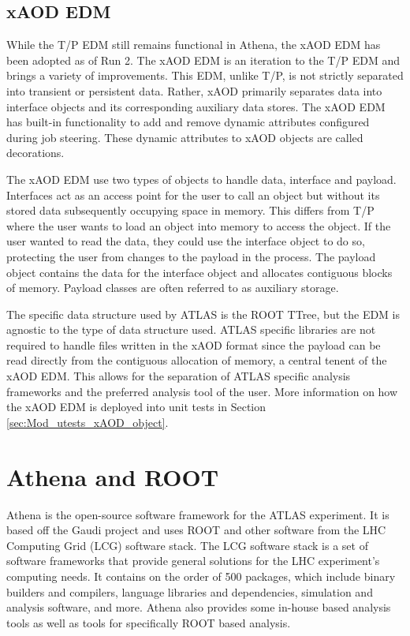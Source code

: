 \subsection{xAOD EDM}
While the T/P EDM still remains functional in Athena, the xAOD EDM has been adopted as of Run 2. 
The xAOD EDM is an iteration to the T/P EDM and brings a variety of improvements.\cite{Buckley_2015}
This EDM, unlike T/P, is not strictly separated into transient or persistent data.
Rather, xAOD primarily separates data into interface objects and its corresponding auxiliary data stores.
The xAOD EDM has built-in functionality to add and remove dynamic attributes configured during job steering.
These dynamic attributes to xAOD objects are called decorations.

The xAOD EDM use two types of objects to handle data, interface and payload. 
Interfaces act as an access point for the user to call an object but without its stored data subsequently occupying space in memory. 
This differs from T/P where the user wants to load an object into memory to access the object. 
If the user wanted to read the data, they could use the interface object to do so, protecting the user from changes to the payload in the process. 
The payload object contains the data for the interface object and allocates contiguous blocks of memory. 
Payload classes are often referred to as auxiliary storage. 

The specific data structure used by ATLAS is the ROOT TTree, but the EDM is agnostic to the type of data structure used. 
ATLAS specific libraries are not required to handle files written in the xAOD format since the payload can be read directly from the contiguous allocation of memory, a central tenent of the xAOD EDM.
This allows for the separation of ATLAS specific analysis frameworks and the preferred analysis tool of the user.
More information on how the xAOD EDM is deployed into unit tests in Section \ref{sec:Mod_utests_xAOD_object}.

\section{Athena and ROOT}
Athena is the open-source software framework for the ATLAS experiment.\cite{athena}
It is based off the Gaudi project and uses ROOT and other software from the LHC Computing Grid (LCG) software stack.\cite{WLCG_Tech_design_report}
The LCG software stack is a set of software frameworks that provide general solutions for the LHC experiment's computing needs. 
It contains on the order of 500 packages, which include binary builders and compilers, language libraries and dependencies, simulation and analysis software, and more.
Athena also provides some in-house based analysis tools as well as tools for specifically ROOT based analysis.

